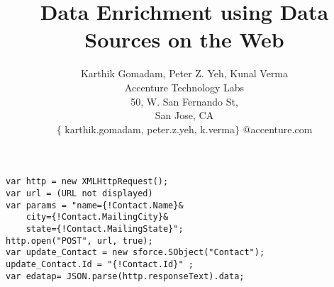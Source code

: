\documentclass{sig-alternate}
\begin{document}
%
\title{Data Enrichment using Data Sources on the Web}
\author{Karthik Gomadam, Peter Z. Yeh, Kunal Verma\\
Accenture Technology Labs\\
50, W. San Fernando St,\\
San Jose, CA\\
$\lbrace$ karthik.gomadam, peter.z.yeh, k.verma$\rbrace$ @accenture.com
}
\maketitle

\newcommand\codeHighlight[1]{\textcolor[rgb]{1,0,0}{\textbf{#1}}}
\begin{Verbatim}[commandchars=\\\{\}]
var http = new XMLHttpRequest();
var url = (URL not displayed)
var params = "name={!Contact.Name}&
	city={!Contact.MailingCity}&
	state={!Contact.MailingState}";
http.open("POST", url, true);
var update_Contact = new sforce.SObject("Contact");
update_Contact.Id = "{!Contact.Id}" ; 
var edatap= JSON.parse(http.responseText).data;
\end{Verbatim}




%


\end{document}
